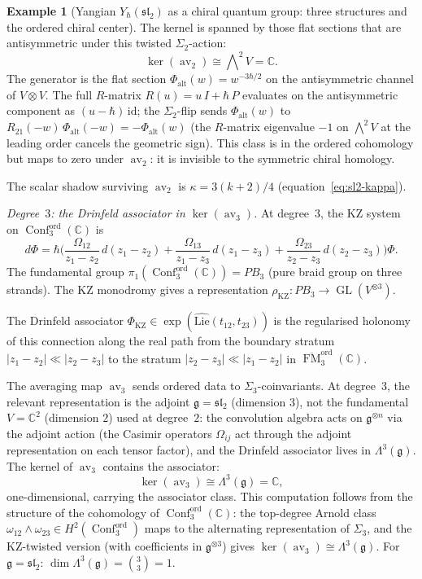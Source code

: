 \documentclass[11pt,reqno]{amsart}
\theoremstyle{definition}
\newtheorem{example}[theorem]{Example}
\theoremstyle{remark}
\newcommand{\Lie}{\mathrm{Lie}}
\DeclareMathOperator{\Conf}{Conf}
\DeclareMathOperator{\FM}{FM}
\DeclareMathOperator{\av}{av}
\newcommand{\fg}{\mathfrak{g}}
\newcommand{\CC}{\mathbb{C}}
\newcommand{\id}{\mathrm{id}}
\numberwithin{equation}{section}
\begin{document}
\begin{example}[Yangian $Y_\hbar(\mathfrak{sl}_2)$
as a chiral quantum group: three structures and the
ordered chiral center]
The kernel is spanned by those flat sections that are
antisymmetric under this twisted $\Sigma_2$-action:
\begin{equation}\label{eq:yangian-ker-av2}
  \ker(\av_2)
  \cong \bigwedge\nolimits^2 V = \CC.
\end{equation}
The generator is the flat section
$\Phi_{\mathrm{alt}}(w) = w^{-3\hbar/2}$
on the antisymmetric channel of $V \otimes V$. The full
$R$-matrix $R(u) = u\,I + \hbar\,P$ evaluates on the
antisymmetric component as $(u - \hbar)\,\id$; the
$\Sigma_2$-flip sends $\Phi_{\mathrm{alt}}(w)$ to
$R_{21}(-w)\,\Phi_{\mathrm{alt}}(-w)
= -\Phi_{\mathrm{alt}}(w)$
(the $R$-matrix eigenvalue $-1$ on $\bigwedge^2 V$ at the
leading order cancels the geometric sign).
This class is in the ordered cohomology but maps to zero
under $\av_2$: it is invisible to the symmetric chiral
homology.

The scalar shadow surviving $\av_2$ is
$\kappa = 3(k + 2)/4$ (equation~\eqref{eq:sl2-kappa}).

\smallskip
\noindent\emph{Degree~$3$: the Drinfeld associator in $\ker(\av_3)$.}
At degree~$3$, the KZ system on $\Conf_3^{\mathrm{ord}}(\CC)$
is
\[
  d\Phi
  = \hbar\biggl(
  \frac{\Omega_{12}}{z_1 - z_2}\,d(z_1 - z_2)
  + \frac{\Omega_{13}}{z_1 - z_3}\,d(z_1 - z_3)
  + \frac{\Omega_{23}}{z_2 - z_3}\,d(z_2 - z_3)
  \biggr)\Phi.
\]
The fundamental group $\pi_1(\Conf_3^{\mathrm{ord}}(\CC))
= PB_3$ (pure braid group on three strands). The KZ
monodromy gives a representation
$\rho_{\mathrm{KZ}} \colon PB_3
\to \operatorname{GL}(V^{\otimes 3})$.

The Drinfeld associator $\Phi_{\mathrm{KZ}}
\in \exp(\widehat{\Lie}(t_{12}, t_{23}))$
is the regularised holonomy of this connection along the
real path from the boundary stratum
$|z_1 - z_2| \ll |z_2 - z_3|$
to the stratum
$|z_2 - z_3| \ll |z_1 - z_2|$
in $\overline{\FM}_3^{\mathrm{ord}}(\CC)$.

The averaging map $\av_3$ sends ordered data to
$\Sigma_3$-coinvariants. At degree~$3$, the relevant
representation is the adjoint $\fg = \mathfrak{sl}_2$
(dimension $3$), not the fundamental $V = \CC^2$
(dimension $2$) used at degree~$2$: the convolution
algebra acts on $\fg^{\otimes n}$ via the adjoint action
(the Casimir operators $\Omega_{ij}$ act through the
adjoint representation on each tensor factor),
and the Drinfeld associator lives in $\Lambda^3(\fg)$.
The kernel of $\av_3$ contains the associator:
\begin{equation}\label{eq:yangian-ker-av3}
  \ker(\av_3)
  \cong \Lambda^3(\fg) = \CC,
\end{equation}
one-dimensional, carrying the associator class. This
computation follows from the structure of the cohomology
of $\Conf_3^{\mathrm{ord}}(\CC)$: the top-degree Arnold
class $\omega_{12} \wedge \omega_{23}
\in H^2(\Conf_3^{\mathrm{ord}})$ maps to the alternating
representation of $\Sigma_3$, and the KZ-twisted version
(with coefficients in $\fg^{\otimes 3}$) gives
$\ker(\av_3) \cong \Lambda^3(\fg)$.
For $\fg = \mathfrak{sl}_2$:
$\dim \Lambda^3(\fg) = \binom{3}{3} = 1$.


\end{example}
\end{document}
